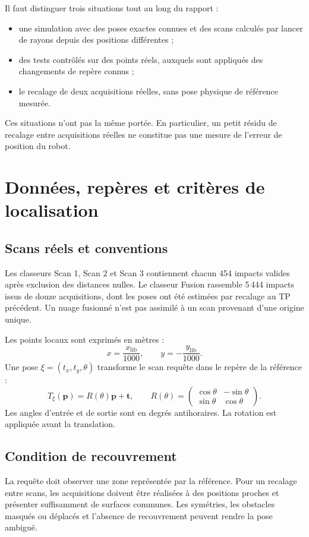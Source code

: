 \documentclass[11pt,a4paper]{article}
\begin{document}
Il faut distinguer trois situations tout au long du rapport :
\begin{itemize}
\item une simulation avec des poses exactes connues et des scans calculés
par lancer de rayons depuis des positions différentes ;
\item des tests contrôlés sur des points réels, auxquels sont appliqués
des changements de repère connus ;
\item le recalage de deux acquisitions réelles, sans pose physique de
référence mesurée.
\end{itemize}
Ces situations n'ont pas la même portée. En particulier, un petit résidu
de recalage entre acquisitions réelles ne constitue pas une mesure de
l'erreur de position du robot.

\section{Données, repères et critères de localisation}
\subsection{Scans réels et conventions}
Les classeurs Scan 1, Scan 2 et Scan 3 contiennent chacun 454 impacts
valides après exclusion des distances nulles. Le classeur Fusion rassemble
5\,444 impacts issus de douze acquisitions, dont les poses ont été estimées
par recalage au TP précédent. Un nuage fusionné n'est pas assimilé à un
scan provenant d'une origine unique.

Les points locaux sont exprimés en mètres :
\[
 x=\frac{x_{\mathrm{lib}}}{1000},\qquad
 y=-\frac{y_{\mathrm{lib}}}{1000}.
\]
Une pose $\xi=(t_x,t_y,\theta)$ transforme le scan requête dans le repère
de la référence :
\[
 T_\xi(\mathbf p)=R(\theta)\mathbf p+\mathbf t,\qquad
 R(\theta)=
 \begin{pmatrix}\cos\theta&-\sin\theta\\\sin\theta&\cos\theta\end{pmatrix}.
\]
Les angles d'entrée et de sortie sont en degrés antihoraires. La rotation
est appliquée avant la translation.

\subsection{Condition de recouvrement}
La requête doit observer une zone représentée par la référence. Pour un
recalage entre scans, les acquisitions doivent être réalisées à des positions
proches et présenter suffisamment de surfaces communes. Les symétries,
les obstacles masqués ou déplacés et l'absence de recouvrement peuvent
rendre la pose ambiguë.
\end{document}
